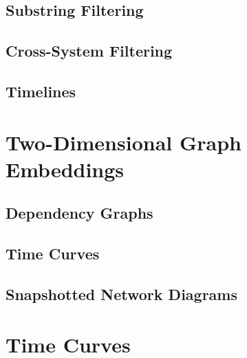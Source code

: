 \subsection{Substring Filtering}

\subsection{Cross-System Filtering}

\subsection{Timelines}


\section{Two-Dimensional Graph Embeddings}

\subsection{Dependency Graphs}

\subsection{Time Curves}

\subsection{Snapshotted Network Diagrams}

\subsection{}



\section{Time Curves}

\subsection{}

\subsection{}

\subsection{}

